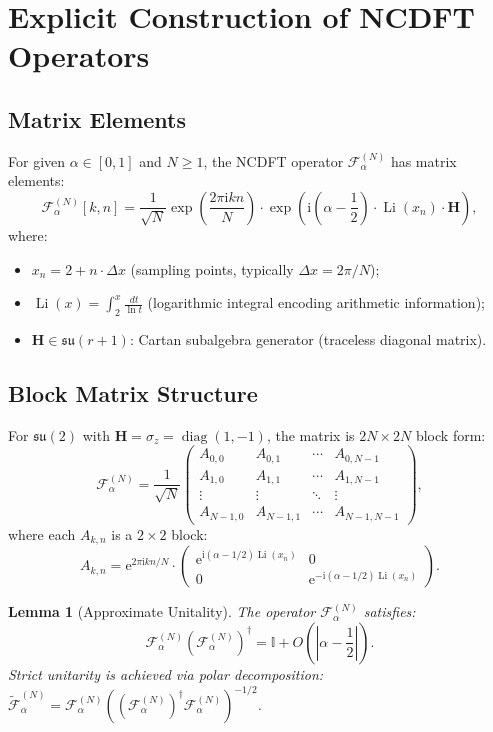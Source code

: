 \documentclass[12pt,a4paper]{article}
\theoremstyle{definition}
\theoremstyle{plain}
\newtheorem{lemma}[theorem]{Lemma}
\theoremstyle{remark}
\DeclareMathOperator{\Li}{Li}
\DeclareMathOperator{\diag}{diag}
\newcommand{\F}{\mathcal{F}}
\newcommand{\diff}{\,d}
\newcommand{\ee}{\mathrm{e}}
\newcommand{\ii}{\mathrm{i}}
\begin{document}
\section{Explicit Construction of NCDFT Operators}

\subsection{Matrix Elements}
For given $\alpha \in [0,1]$ and $N \geq 1$, the NCDFT operator $\F_\alpha^{(N)}$ has matrix elements:
\begin{equation}\label{eq:ncdft}
\F_\alpha^{(N)}[k,n] = \frac{1}{\sqrt{N}} \exp\left(\frac{2\pi\ii kn}{N}\right) \cdot \exp\left(\ii\left(\alpha - \frac{1}{2}\right) \cdot \Li(x_n) \cdot \mathbf{H}\right),
\end{equation}
where:
\begin{itemize}
    \item $x_n = 2 + n \cdot \Delta x$ (sampling points, typically $\Delta x = 2\pi/N$);
    \item $\Li(x) = \int_2^x \frac{\diff t}{\ln t}$ (logarithmic integral encoding arithmetic information);
    \item $\mathbf{H} \in \mathfrak{su}(r+1)$: Cartan subalgebra generator (traceless diagonal matrix).
\end{itemize}

\subsection{Block Matrix Structure}
For $\mathfrak{su}(2)$ with $\mathbf{H} = \sigma_z = \diag(1,-1)$, the matrix is $2N \times 2N$ block form:
\[
\F_\alpha^{(N)} = \frac{1}{\sqrt{N}} \begin{pmatrix} 
A_{0,0} & A_{0,1} & \cdots & A_{0,N-1} \\
A_{1,0} & A_{1,1} & \cdots & A_{1,N-1} \\
\vdots & \vdots & \ddots & \vdots \\
A_{N-1,0} & A_{N-1,1} & \cdots & A_{N-1,N-1}
\end{pmatrix},
\]
where each $A_{k,n}$ is a $2 \times 2$ block:
\[
A_{k,n} = \ee^{2\pi\ii kn/N} \cdot \begin{pmatrix} 
\ee^{\ii(\alpha-1/2)\Li(x_n)} & 0 \\
0 & \ee^{-\ii(\alpha-1/2)\Li(x_n)}
\end{pmatrix}.
\]

\begin{lemma}[Approximate Unitality]\label{lem:unitary}
The operator $\F_\alpha^{(N)}$ satisfies:
\[
\F_\alpha^{(N)} (\F_\alpha^{(N)})^\dagger = \mathbb{I} + O\left(\left|\alpha - \frac{1}{2}\right|\right).
\]
Strict unitarity is achieved via polar decomposition: $\tilde{\F}_\alpha^{(N)} = \F_\alpha^{(N)}((\F_\alpha^{(N)})^\dagger \F_\alpha^{(N)})^{-1/2}$.
\end{lemma}
\end{document}
